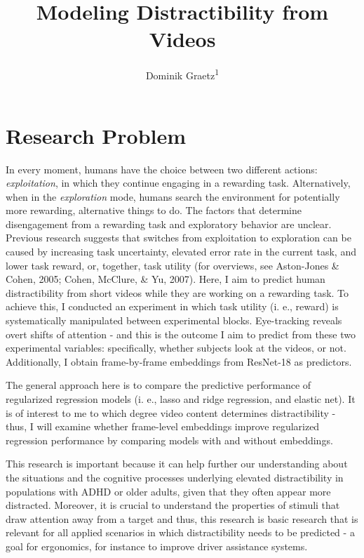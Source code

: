\documentclass[
  man]{apa6}
\title{Modeling Distractibility from Videos}
\author{Dominik Graetz\textsuperscript{1}}
\date{}
\affiliation{\vspace{0.5cm}\textsuperscript{1} University of Oregon}
\begin{document}
\maketitle

\hypertarget{research-problem}{%
\section{Research Problem}\label{research-problem}}

In every moment, humans have the choice between two different actions: \emph{exploitation}, in which they continue engaging in a rewarding task. Alternatively, when in the \emph{exploration} mode, humans search the environment for potentially more rewarding, alternative things to do. The factors that determine disengagement from a rewarding task and exploratory behavior are unclear. Previous research suggests that switches from exploitation to exploration can be caused by increasing task uncertainty, elevated error rate in the current task, and lower task reward, or, together, task utility (for overviews, see Aston-Jones \& Cohen, 2005; Cohen, McClure, \& Yu, 2007). Here, I aim to predict human distractibility from short videos while they are working on a rewarding task. To achieve this, I conducted an experiment in which task utility (i. e., reward) is systematically manipulated between experimental blocks. Eye-tracking reveals overt shifts of attention - and this is the outcome I aim to predict from these two experimental variables: specifically, whether subjects look at the videos, or not. Additionally, I obtain frame-by-frame embeddings from ResNet-18 as predictors.

The general approach here is to compare the predictive performance of regularized regression models (i. e., lasso and ridge regression, and elastic net). It is of interest to me to which degree video content determines distractibility - thus, I will examine whether frame-level embeddings improve regularized regression performance by comparing models with and without embeddings.

This research is important because it can help further our understanding about the situations and the cognitive processes underlying elevated distractibility in populations with ADHD or older adults, given that they often appear more distracted. Moreover, it is crucial to understand the properties of stimuli that draw attention away from a target and thus, this research is basic research that is relevant for all applied scenarios in which distractibility needs to be predicted - a goal for ergonomics, for instance to improve driver assistance systems.
\end{document}

